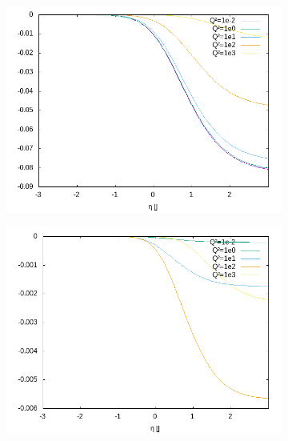 \begin{figure}[ht!]
\centering
\begin{subfigure}[t]{.3\textwidth}
	\includegraphics[width=\textwidth]{../../img2/partonic/cqBarF1_VV_F2}
\end{subfigure}%
\begin{subfigure}[t]{.3\textwidth}
	\includegraphics[width=\textwidth]{../../img2/partonic/cqBarF1_VV_FL}
\end{subfigure}%
\begin{subfigure}[t]{.3\textwidth}

\end{subfigure}
\end{figure}
